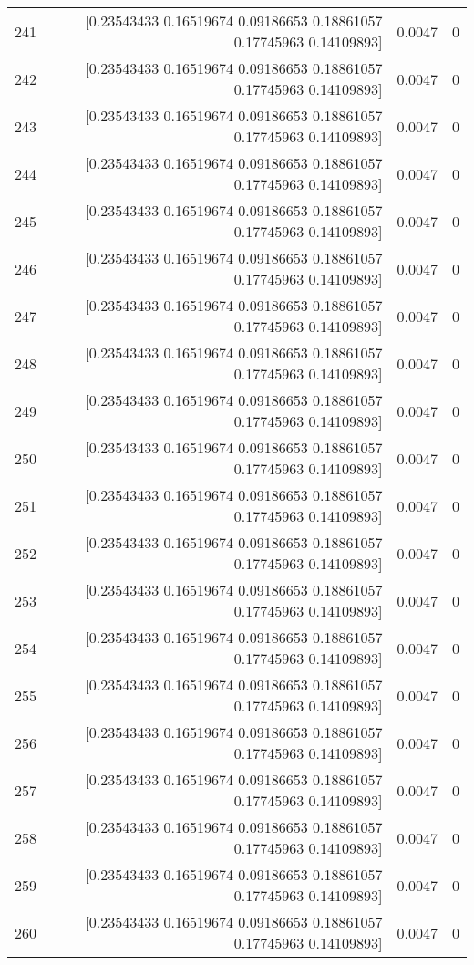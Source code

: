 \begin{longtable}{lrrr}
241 & [0.23543433 0.16519674 0.09186653 0.18861057 0.17745963 0.14109893] & 0.0047 & 0 \\
242 & [0.23543433 0.16519674 0.09186653 0.18861057 0.17745963 0.14109893] & 0.0047 & 0 \\
243 & [0.23543433 0.16519674 0.09186653 0.18861057 0.17745963 0.14109893] & 0.0047 & 0 \\
244 & [0.23543433 0.16519674 0.09186653 0.18861057 0.17745963 0.14109893] & 0.0047 & 0 \\
245 & [0.23543433 0.16519674 0.09186653 0.18861057 0.17745963 0.14109893] & 0.0047 & 0 \\
246 & [0.23543433 0.16519674 0.09186653 0.18861057 0.17745963 0.14109893] & 0.0047 & 0 \\
247 & [0.23543433 0.16519674 0.09186653 0.18861057 0.17745963 0.14109893] & 0.0047 & 0 \\
248 & [0.23543433 0.16519674 0.09186653 0.18861057 0.17745963 0.14109893] & 0.0047 & 0 \\
249 & [0.23543433 0.16519674 0.09186653 0.18861057 0.17745963 0.14109893] & 0.0047 & 0 \\
250 & [0.23543433 0.16519674 0.09186653 0.18861057 0.17745963 0.14109893] & 0.0047 & 0 \\
251 & [0.23543433 0.16519674 0.09186653 0.18861057 0.17745963 0.14109893] & 0.0047 & 0 \\
252 & [0.23543433 0.16519674 0.09186653 0.18861057 0.17745963 0.14109893] & 0.0047 & 0 \\
253 & [0.23543433 0.16519674 0.09186653 0.18861057 0.17745963 0.14109893] & 0.0047 & 0 \\
254 & [0.23543433 0.16519674 0.09186653 0.18861057 0.17745963 0.14109893] & 0.0047 & 0 \\
255 & [0.23543433 0.16519674 0.09186653 0.18861057 0.17745963 0.14109893] & 0.0047 & 0 \\
256 & [0.23543433 0.16519674 0.09186653 0.18861057 0.17745963 0.14109893] & 0.0047 & 0 \\
257 & [0.23543433 0.16519674 0.09186653 0.18861057 0.17745963 0.14109893] & 0.0047 & 0 \\
258 & [0.23543433 0.16519674 0.09186653 0.18861057 0.17745963 0.14109893] & 0.0047 & 0 \\
259 & [0.23543433 0.16519674 0.09186653 0.18861057 0.17745963 0.14109893] & 0.0047 & 0 \\
260 & [0.23543433 0.16519674 0.09186653 0.18861057 0.17745963 0.14109893] & 0.0047 & 0 \\

\end{longtable}

